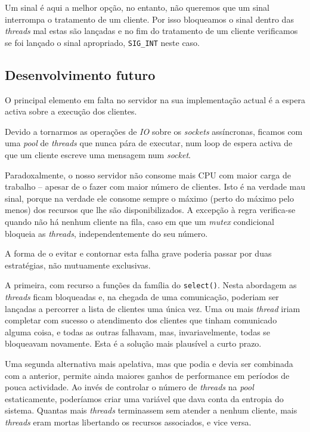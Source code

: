 	Um sinal é aqui a melhor opção, no entanto, não queremos que um sinal interrompa o tratamento de um cliente.
	Por isso bloqueamos o sinal dentro das \emph{threads} mal estas são lançadas e no fim do tratamento de um cliente verificamos se foi lançado o sinal apropriado, \verb|SIG_INT| neste caso.

\clearpage
\subsection{Desenvolvimento futuro\label{sec:servidor_desenvolvimento}}

	\indent\indent O principal elemento em falta no servidor na sua implementação actual é a espera activa sobre a execução dos clientes.
	
	Devido a tornarmos as operações de \emph{IO} sobre os \emph{sockets} assíncronas, ficamos com uma \emph{pool} de \emph{threads} que nunca pára de executar, num loop de espera activa de que um cliente escreve uma mensagem num \emph{\emph{socket}}.
	
	Paradoxalmente, o nosso servidor não consome mais CPU com maior carga de trabalho -- apesar de o fazer com maior número de clientes.
	Isto é na verdade mau sinal, porque na verdade ele consome sempre o máximo (perto do máximo pelo menos) dos recursos que lhe são disponibilizados.
	A excepção à regra verifica-se quando não há nenhum cliente na fila, caso em que um \emph{mutex} condicional bloqueia as \emph{threads}, independentemente do seu número.
	
	A forma de o evitar e contornar esta falha grave poderia passar por duas estratégias, não mutuamente exclusivas.
	
	A primeira, com recurso a funções da família do \verb|select()|.
	Nesta abordagem as \emph{threads} ficam bloqueadas e, na chegada de uma comunicação, poderiam ser lançadas a percorrer a lista de clientes uma única vez.
	Uma ou mais \emph{thread} iriam completar com sucesso o atendimento dos clientes que tinham comunicado alguma coisa, e todas as outras falhavam, mas, invariavelmente, todas se bloqueavam novamente.
	Esta é a solução mais plausível a curto prazo.
	
	Uma segunda alternativa mais apelativa, mas que podia e devia ser combinada com a anterior, permite ainda maiores ganhos de performance em períodos de pouca actividade.
	Ao invés de controlar o número de \emph{threads} na \emph{pool} estaticamente, poderíamos criar uma variável que dava conta da entropia do sistema.
	Quantas mais \emph{threads} terminassem sem atender a nenhum cliente, mais \emph{threads} eram mortas libertando os recursos associados, e vice versa.
		
